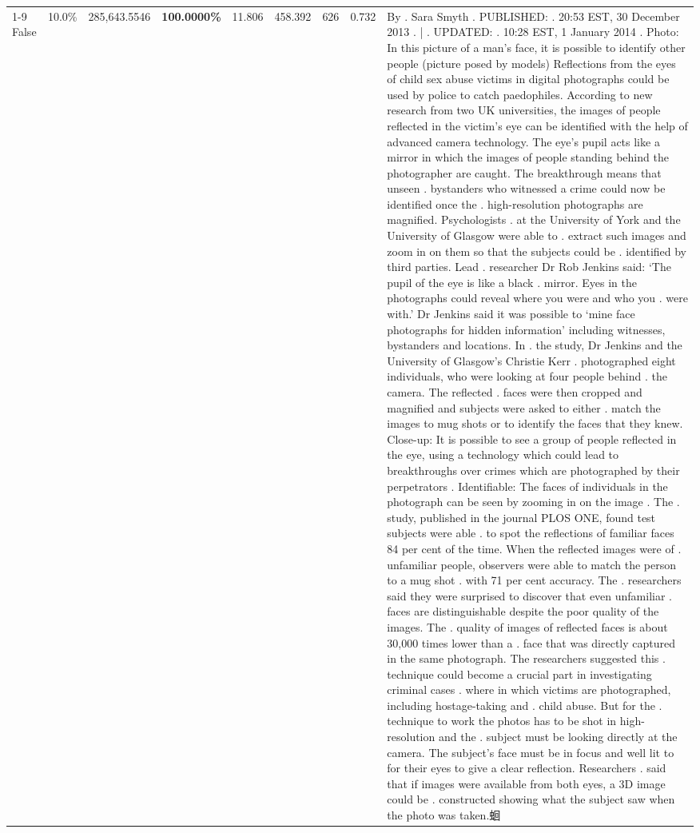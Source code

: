\begin{table}[H]
\begin{tabular}{lllrlllll}
\cline{1-9}
False & 10.0\% & \color{red} 285,643.5546 & \bfseries \color{red} 100.0000\% & 11.806 & 458.392 & 626 & 0.732 & By . Sara Smyth . PUBLISHED: . 20:53 EST, 30 December 2013 . | . UPDATED: . 10:28 EST, 1 January 2014 . Photo: In this picture of a man's face, it is possible to identify other people (picture posed by models) Reflections from the eyes of child sex abuse victims in digital photographs could be used by police to catch paedophiles. According to new research from two UK universities, the images of people reflected in the victim's eye can be identified with the help of advanced camera technology. The eye's pupil acts like a mirror in which the images of people standing behind the photographer are caught. The breakthrough means that unseen . bystanders who witnessed a crime could now be identified once the . high-resolution photographs are magnified. Psychologists . at the University of York and the University of Glasgow were able to . extract such images and zoom in on them so that the subjects could be . identified by third parties. Lead . researcher Dr Rob Jenkins said: ‘The pupil of the eye is like a black . mirror. Eyes in the photographs could reveal where you were and who you . were with.' Dr Jenkins said it was possible to ‘mine face photographs for hidden information' including witnesses, bystanders and locations. In . the study, Dr Jenkins and the University of Glasgow's Christie Kerr . photographed eight individuals, who were looking at four people behind . the camera. The reflected . faces were then cropped and magnified and subjects were asked to either . match the images to mug shots or to identify the faces that they knew. Close-up: It is possible to see a group of people reflected in the eye, using a technology which could lead to breakthroughs over crimes which are photographed by their perpetrators . Identifiable: The faces of individuals in the photograph can be seen by zooming in on the image . The . study, published in the journal PLOS ONE, found test subjects were able . to spot the reflections of familiar faces 84 per cent of the time. When the reflected images were of . unfamiliar people, observers were able to match the person to a mug shot . with 71 per cent accuracy. The . researchers said they were surprised to discover that even unfamiliar . faces are distinguishable despite the poor quality of the images. The . quality of images of reflected faces is about 30,000 times lower than a . face that was directly captured in the same photograph. The researchers suggested this . technique could become a crucial part in investigating criminal cases . where in which victims are photographed, including hostage-taking and . child abuse. But for the . technique to work the photos has to be shot in high-resolution and the . subject must be looking directly at the camera. The subject's face must be in focus and well lit to for their eyes to give a clear reflection. Researchers . said that if images were available from both eyes, a 3D image could be . constructed showing what the subject saw when the photo was taken.蛔 \\

\end{tabular}
\end{table}

